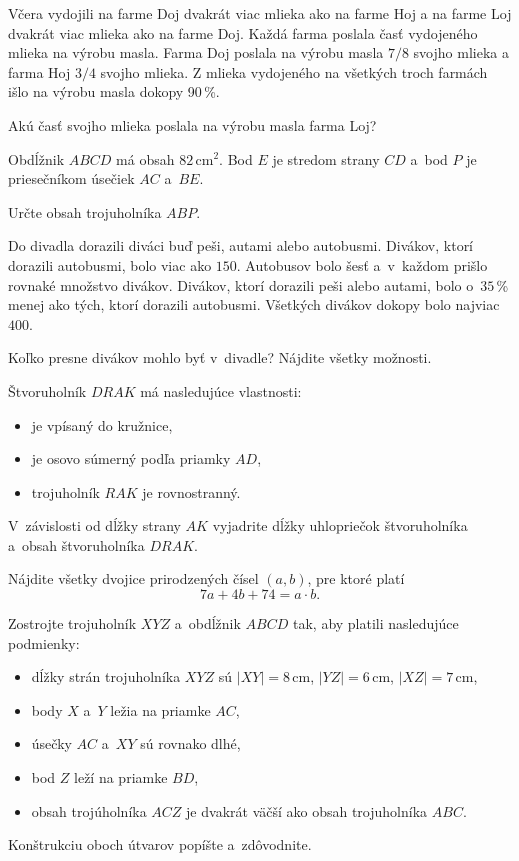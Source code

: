{%
Včera vydojili na farme Doj dvakrát viac mlieka ako na farme Hoj a na farme Loj dvakrát viac mlieka ako na farme Doj.
Každá farma poslala časť vydojeného mlieka na výrobu masla.
Farma Doj poslala na výrobu masla $7/8$ svojho mlieka  a farma Hoj $3/4$ svojho mlieka.
Z mlieka vydojeného na všetkých troch farmách išlo na výrobu masla dokopy 90\,\%.

Akú časť svojho mlieka poslala na výrobu masla farma Loj?
}

{%
Obdĺžnik $ABCD$ má obsah $82$\,cm$^2$.
Bod $E$ je stredom strany $CD$ a~bod $P$ je priesečníkom úsečiek $AC$ a~$BE$.

Určte obsah trojuholníka $ABP$.
}

{%
Do divadla dorazili diváci buď peši, autami alebo autobusmi.
Divákov, ktorí dorazili autobusmi, bolo viac ako $150$. Autobusov bolo šesť a~v~každom prišlo rovnaké množstvo divákov.
Divákov, ktorí dorazili peši alebo autami, bolo o~$35$\,\% menej ako tých, ktorí dorazili autobusmi.
Všetkých divákov dokopy bolo najviac $400$.

Koľko presne divákov mohlo byť v~divadle?
Nájdite všetky možnosti.
}

{%
Štvoruholník $DRAK$ má nasledujúce vlastnosti:
\begin{itemize}
 \item je vpísaný do kružnice,
 \item je osovo súmerný podľa priamky $AD$,
 \item trojuholník $RAK$ je rovnostranný.
\end{itemize}
V~závislosti od dĺžky strany $AK$ vyjadrite dĺžky uhlopriečok štvoruholníka a~obsah štvoruholníka $DRAK$.
}

{%
Nájdite všetky dvojice prirodzených čísel $(a, b)$, pre ktoré platí
$$
7a + 4b + 74 = a\cdot b.
$$
}

{%
Zostrojte trojuholník $XYZ$ a~obdĺžnik $ABCD$ tak, aby platili nasledujúce podmienky:
\begin{itemize}
  \item dĺžky strán trojuholníka $XYZ$ sú $|XY|=8$\,cm, $|YZ|=6$\,cm, $|XZ|=7$\,cm,
  \item body $X$ a~$Y$ ležia na priamke $AC$,
  \item úsečky $AC$ a~$XY$ sú rovnako dlhé,
  \item bod $Z$ leží na priamke $BD$,
  \item obsah trojúholníka $ACZ$ je dvakrát väčší ako obsah trojuholníka $ABC$.
\end{itemize}
Konštrukciu oboch útvarov popíšte a~zdôvodnite.
}

